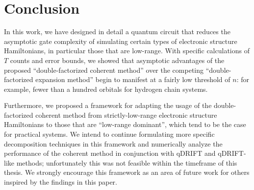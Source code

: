 

\chapter{Conclusion}

In this work, we have designed in detail a quantum circuit that reduces the asymptotic gate complexity of simulating certain types of electronic structure Hamiltonians, in particular those that are low-range. With specific calculations of $T$ counts and error bounds, we showed that asymptotic advantages of the proposed ``double-factorized coherent method'' over the competing ``double-factorized expansion method'' begin to manifest at a fairly low threshold of $n$: for example, fewer than a hundred orbitals for hydrogen chain systems.

Furthermore, we proposed a framework for adapting the usage of the double-factorized coherent method from strictly-low-range electronic structure Hamiltonians to those that are ``low-range dominant'', which tend to be the case for practical systems. We intend to continue formulating more specific decomposition techniques in this framework and numerically analyze the performance of the coherent method in conjunction with qDRIFT and qDRIFT-like methods; unfortunately this was not feasible within the timeframe of this thesis. We strongly encourage this framework as an area of future work for others inspired by the findings in this paper.


